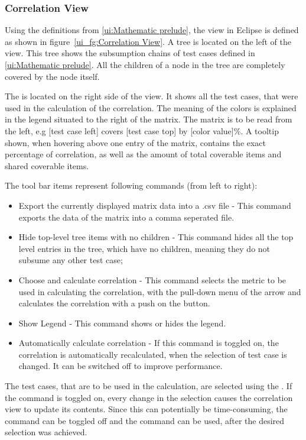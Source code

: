 \subsubsection{Correlation View}
Using the definitions from \ref{ui:Mathematic prelude}, the view in Eclipse is defined as shown in figure~\ref{ui_fg:Correlation View}. A tree is located on the left of the view. This tree shows the subsumption chains of test cases defined in \ref{ui:Mathematic prelude}. All the children of a node in the tree are completely covered by the node itself.
\par	
The  is located on the right side of the view. It shows all the test cases, that were used in the calculation of the correlation. The meaning of the colors is explained in the legend situated to the right of the matrix. The matrix is to be read from the left, e.g [test case left] covers [test case top] by [color value]\%. A tooltip shown, when hovering above one entry of the matrix, contains the exact percentage of correlation, as well as the amount of total coverable items and shared coverable items.
\par	
The tool bar items represent following commands (from left to right):
\begin{itemize}
\item Export the currently displayed matrix data into a .csv file - This command exports the data of the matrix into a comma seperated file.
\item Hide top-level tree items with no children - This command hides all the top level entries in the tree, which have no children, meaning they do not subsume any other test case;
\item Choose and calculate correlation - This command selects the metric to be used in calculating the correlation, with the pull-down menu of the arrow and calculates the correlation with a push on the button.
\item Show Legend - This command shows or hides the legend.
\item Automatically calculate correlation - If this command is toggled on, the correlation is automatically recalculated, when the selection of test case is changed. It can be switched off to improve performance.
\end{itemize}
\par
The test cases, that are to be used in the calculation, are selected using the . If the  command is toggled on, every change in the selection causes the correlation view to update its contents. Since this can potentially be time-consuming, the  command can be toggled off and the  command can be used, after the desired selection was achieved.


